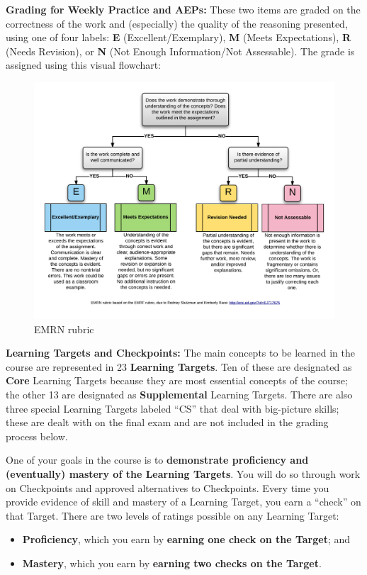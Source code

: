 \documentclass[]{article}
\providecommand{\tightlist}{%
  \setlength{\itemsep}{0pt}\setlength{\parskip}{0pt}}
\begin{document}
\textbf{Grading for Weekly Practice and AEPs:} These two items are
graded on the correctness of the work and (especially) the quality of
the reasoning presented, using one of four labels: \textbf{E}
(Excellent/Exemplary), \textbf{M} (Meets Expectations), \textbf{R}
(Needs Revision), or \textbf{N} (Not Enough Information/Not Assessable).
The grade is assigned using this visual flowchart:

\begin{figure}
\centering
\includegraphics{EMRN.png}
\caption{EMRN rubric}
\end{figure}

\textbf{Learning Targets and Checkpoints:} The main concepts to be
learned in the course are represented in 23 \textbf{Learning Targets}.
Ten of these are designated as \textbf{Core} Learning Targets because
they are most essential concepts of the course; the other 13 are
designated as \textbf{Supplemental} Learning Targets. There are also
three special Learning Targets labeled ``CS'' that deal with big-picture
skills; these are dealt with on the final exam and are not included in
the grading process below.

One of your goals in the course is to \textbf{demonstrate proficiency
and (eventually) mastery of the Learning Targets}. You will do so
through work on Checkpoints and approved alternatives to Checkpoints.
Every time you provide evidence of skill and mastery of a Learning
Target, you earn a ``check'' on that Target. There are two levels of
ratings possible on any Learning Target:

\begin{itemize}
\tightlist
\item
  \textbf{Proficiency}, which you earn by \textbf{earning one check on
  the Target}; and
\item
  \textbf{Mastery}, which you earn by \textbf{earning two checks on the
  Target}.
\end{itemize}
\end{document}
